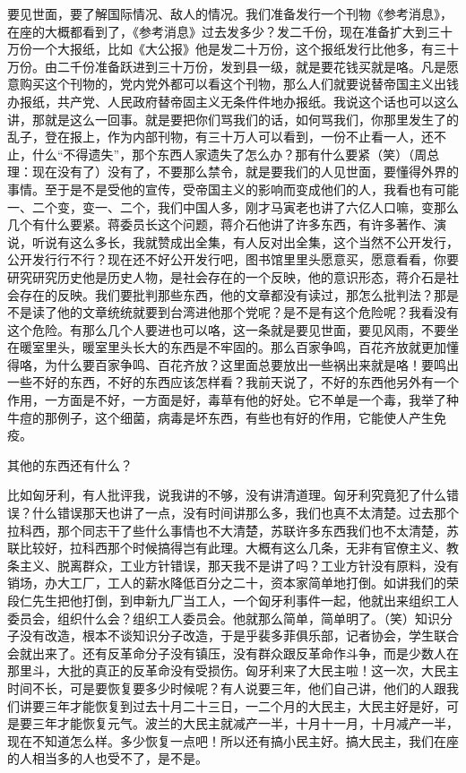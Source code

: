 要见世面，要了解国际情况、敌人的情况。我们准备发行一个刊物《参考消息》，在座的大概都看到了，《参考消息》过去发多少？发二千份，现在准备扩大到三十万份一个大报纸，比如《大公报》他是发二十万份，这个报纸发行比他多，有三十万份。由二千份准备跃进到三十万份，发到县一级，就是要花钱买就是咯。凡是愿意购买这个刊物的，党内党外都可以看这个刊物，那么人们就要说替帝国主义出钱办报纸，共产党、人民政府替帝固主义无条件件地办报纸。我说这个话也可以这么讲，那就是这么一回事。就是要把你们骂我们的话，如何骂我们，你那里发生了的乱子，登在报上，作为内部刊物，有三十万人可以看到，一份不止看一人，还不止，什么“不得遗失”，那个东西人家遗失了怎么办？那有什么要紧（笑）（周总理：现在没有了）没有了，不要那么禁令，就是要我们的人见世面，要懂得外界的事情。至于是不是受他的宣传，受帝国主义的影响而变成他们的人，我看也有可能一、二个变，变一、二个，我们中国人多，刚才马寅老也讲了六亿人口嘛，变那么几个有什么要紧。蒋委员长这个问题，蒋介石他讲了许多东西，有许多著作、演说，听说有这么多长，我就赞成出全集，有人反对出全集，这个当然不公开发行，公开发行行不行？现在还不好公开发行吧，图书馆里里头愿意买，愿意看看，你要研究研究历史他是历史人物，是社会存在的一个反映，他的意识形态，蒋介石是社会存在的反映。我们要批判那些东西，他的文章都没有读过，那怎么批判法？那是不是读了他的文章统统就要到台湾进他那个党呢？是不是有这个危险呢？我看没有这个危险。有那么几个人要进也可以咯，这一条就是要见世面，要见风雨，不要坐在暖室里头，暖室里头长大的东西是不牢固的。那么百家争鸣，百花齐放就更加懂得咯，为什么要百家争鸣、百花齐放？这里面总要放出一些祸出来就是咯！要鸣出一些不好的东西，不好的东西应该怎样看？我前天说了，不好的东西他另外有一个作用，一方面是不好，一方面是好，毒草有他的好处。它不单是一个毒，我举了种牛痘的那例子，这个细菌，病毒是坏东西，有些也有好的作用，它能使人产生免疫。

其他的东西还有什么？

比如匈牙利，有人批评我，说我讲的不够，没有讲清道理。匈牙利究竟犯了什么错误？什么错误那天也讲了一点，没有时间讲那么多，我们也真不太清楚。过去那个拉科西，那个同志干了些什么事情也不大清楚，苏联许多东西我们也不太清楚，苏联比较好，拉科西那个时候搞得岂有此理。大概有这么几条，无非有官僚主义、教条主义、脱离群众，工业方针错误，那天我不是讲了吗？工业方针没有原料，没有销场，办大工厂，工人的薪水降低百分之二十，资本家简单地打倒。如讲我们的荣段仁先生把他打倒，到申新九厂当工人，一个匈牙利事件一起，他就出来组织工人委员会，组织什么会？组织工人委员会。他就那么简单，简单明了。（笑）知识分子没有改造，根本不谈知识分子改造，于是乎裴多菲俱乐部，记者协会，学生联合会就出来了。还有反革命分子没有镇压，没有群众跟反革命作斗争，而是少数人在那里斗，大批的真正的反革命没有受损伤。匈牙利来了大民主啦！这一次，大民主时间不长，可是要恢复要多少时候呢？有人说要三年，他们自己讲，他们的人跟我们讲要三年才能恢复到过去十月二十三日，一二个月的大民主，大民主好是好，可是要三年才能恢复元气。波兰的大民主就减产一半，十月十一月，十月减产一半，现在不知道怎么样。多少恢复一点吧！所以还有搞小民主好。搞大民主，我们在座的人相当多的人也受不了，是不是。

